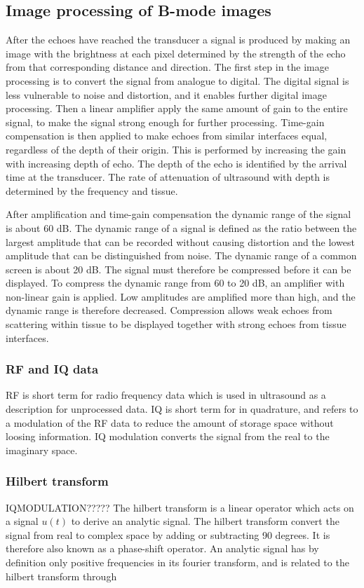 \subsection{Image processing of B-mode images}
After the echoes have reached the transducer a signal is produced by making an image with the brightness at each pixel determined by the strength of the echo from that corresponding distance and direction. The first step in the image processing is to convert the signal from analogue to digital. The digital signal is less vulnerable to noise and distortion, and it enables further digital image processing. Then a linear amplifier apply the same amount of gain to the entire signal, to make the signal strong enough for further processing. Time-gain compensation is then applied to make echoes from similar interfaces equal, regardless of the depth of their origin. This is performed by increasing the gain with increasing depth of echo. The depth of the echo is identified by the arrival time at the transducer. The rate of attenuation of ultrasound with depth is determined by the frequency and tissue.

After amplification and time-gain compensation the dynamic range of the signal is about 60 dB. The dynamic range of a signal is defined as the ratio between the largest amplitude that can be recorded without causing distortion and the lowest amplitude that can be distinguished from noise. The dynamic range of a common screen is about 20 dB. The signal must therefore be compressed before it can be displayed. To compress the dynamic range from 60 to 20 dB, an amplifier with non-linear gain is applied. Low amplitudes are amplified more than high, and the dynamic range is therefore decreased. Compression allows weak echoes from scattering within tissue to be displayed together with strong echoes from tissue interfaces.

\subsubsection{RF and IQ data}
RF is short term for radio frequency data which is used in ultrasound as a description for unprocessed data. IQ is short term for in quadrature, and refers to a modulation of the RF data to reduce the amount of storage space without loosing information. IQ modulation converts the signal from the real to the imaginary space.

\subsubsection{Hilbert transform}
IQMODULATION?????
The hilbert transform is a linear operator which acts on a signal $u(t)$ to derive an analytic signal. The hilbert transform convert the signal from real to complex space by adding or subtracting 90 degrees. It is therefore also known as a phase-shift operator. An analytic signal has by definition only positive frequencies in its fourier transform, and is related to the hilbert transform through 

